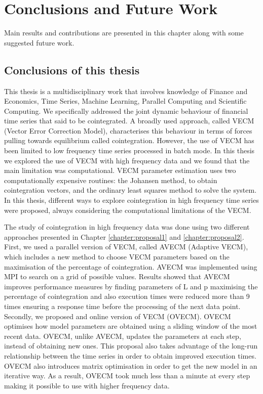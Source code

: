 
\chapter{Conclusions and Future Work}
\label{chapter:conclusions}
Main results and contributions are presented in this chapter along with some
suggested future work.

\vspace{0.5cm} 

\section{Conclusions of this thesis}

This thesis is a multidisciplinary work that involves knowledge of Finance
and Economics, Time Series, Machine Learning, Parallel Computing and Scientific
Computing. We specifically addressed the joint dynamic behaviour of financial time
series that said to be cointegrated. A broadly used approach, called VECM (Vector
Error Correction Model), characterises this behaviour in terms of forces pulling
towards equilibrium called cointegration. However, the use of VECM has been
limited to low frequency time series processed in batch mode. In this thesis we
explored the use of VECM with high frequency data and we found that the main
limitation was computational. VECM parameter estimation uses two computationally
expensive routines: the Johansen method, to obtain cointegration vectors, and
the ordinary least squares method to solve the system. In this thesis, different
ways to explore cointegration in high frequency time series were proposed,
always considering the computational limitations of the VECM.

The study of cointegration in high frequency data was done using two different
approaches presented in Chapter \ref{chapter:proposal1} and
\ref{chapter:proposal2}. First, we used a parallel version of VECM, called AVECM
(Adaptive VECM), which includes a new method to choose VECM parameters based on
the maximisation of the percentage of cointegration. AVECM was implemented using
MPI to search on a grid of possible values. Results showed that AVECM improves
performance measures by finding parameters of L and p maximising the percentage
of cointegration and also execution times were reduced more than 9 times
ensuring a response time before the processing of the next data point.
Secondly, we proposed and online version of VECM (OVECM). OVECM optimises how
model parameters are obtained using a sliding window of the most recent data.
OVECM, unlike AVECM, updates the parameters at each step, instead of obtaining
new ones. This proposal also takes advantage of the long-run relationship
between the time series in order to obtain improved execution times. OVECM also
introduces matrix optimisation in order to get the new model in an iterative
way.  As a result, OVECM took much less than a minute at every
step making it possible to use with higher frequency data.  

